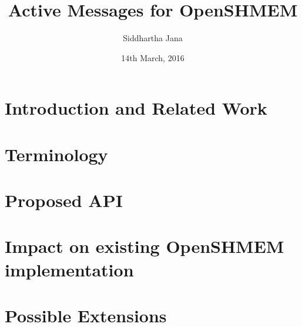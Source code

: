 \documentclass{llncs}
\begin{document}
\title{Active Messages for OpenSHMEM}

\author{Siddhartha Jana}

\date{14th March, 2016}
\maketitle

\begin{abstract}
    \label{sec:abstract}
    
\end{abstract}

\section{Introduction and Related Work}
\label{sec:intro}


\section{Terminology}
\label{sec:terminology}

\section{Proposed API} 
\label{sec:api}


\section{Impact on existing OpenSHMEM 
implementation}
\label{sec:impact}

\section{Possible Extensions}
\label{sec:extensions}

\end{document}
